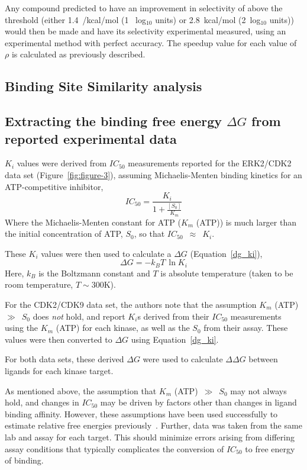 \documentclass[phd,tocprelim]{cornell}
\begin{document}
Any compound predicted to have an improvement in selectivity of above the threshold (either 1.4~/kcal/mol (1 ~log$_{10}$ units) or 2.8~kcal/mol (2~log$_{10}$ units)) would then be made and have its selectivity experimental measured, using an experimental method with perfect accuracy. 
The speedup value for each value of $\rho$ is calculated as previously described. 

\subsection{Binding Site Similarity analysis}

\subsection{Extracting the binding free energy $\Delta G$ from reported experimental data}

$K_i$ values were derived from $IC_{50}$ measurements reported for the ERK2/CDK2 data set (Figure~\ref{fig:figure-3}), assuming Michaelis-Menten binding kinetics for an ATP-competitive inhibitor,
\begin{equation}\label{ki_ic50}
IC_{50} = \frac{K_i}{1 + \frac{[S_0]}{K_m}}
\end{equation}
Where the Michaelis-Menten constant for ATP ($K_m$ (ATP)) is much larger than the initial concentration of ATP, $S_0$, so that $IC_{50}$~$\approx$~$K_i$. 

These $K_i$ values were then used to calculate a $\Delta G$ (Equation~\ref{dg_ki}),
\begin{equation}\label{dg_ki}
\Delta G = -k_B T \, \ln {K_i}
\end{equation}
Here, $k_B$ is the Boltzmann constant and $T$ is absolute temperature (taken to be room temperature, $T \sim 300$K). 

For the CDK2/CDK9 data set, the authors note that the assumption $K_m$ (ATP)~$\gg$~$S_0$ does \emph{not} hold, and report $K_i$s derived from their $IC_{50}$ measurements using the $K_m$ (ATP) for each kinase, as well as the $S_0$ from their assay. 
These values were then converted to $\Delta G$ using  Equation~\ref{dg_ki}. 

For both data sets, these derived $\Delta G$ were used to calculate $\Delta \Delta G$ between ligands for each kinase target.

As mentioned above, the assumption that $K_m$ (ATP)~$\gg$~$S_0$ may not always hold, and changes in $IC_{50}$ may be driven by factors other than changes in ligand binding affinity. 
However, these assumptions have been used successfully to estimate relative free energies previously~\citep{Hauser:2018vz,Michel:J.Med.Chem.:2006}. 
Further, data was taken from the same lab and assay for each target. 
This should minimize errors arising from differing assay conditions that typically complicates the conversion of $IC_{50}$ to free energy of binding. 
\end{document}
